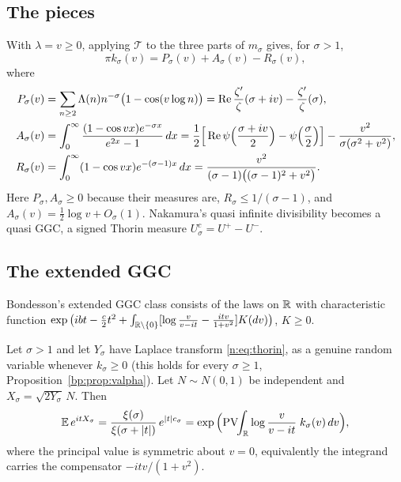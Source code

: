 \subsection{The pieces}

With $\lambda=v\ge0$, applying $\mathcal T$ to the three parts of $m_\sigma$ gives, for $\sigma>1$,
\begin{equation}\label{n:eq:pieces}
\pi k_\sigma(v)=P_\sigma(v)+A_\sigma(v)-R_\sigma(v),
\end{equation}
where
\begin{align*}
P_\sigma(v)&=\sum_{n\ge2}\Lambda(n)n^{-\sigma}\big(1-\cos(v\log n)\big)=\operatorname{Re}\frac{\zeta'}{\zeta}(\sigma+iv)-\frac{\zeta'}{\zeta}(\sigma),\\
A_\sigma(v)&=\int_0^\infty\frac{(1-\cos vx)e^{-\sigma x}}{e^{2x}-1}\,dx=\frac12\Big[\operatorname{Re}\psi\Big(\frac{\sigma+iv}2\Big)-\psi\Big(\frac\sigma2\Big)\Big]-\frac{v^2}{\sigma(\sigma^2+v^2)},\\
R_\sigma(v)&=\int_0^\infty(1-\cos vx)e^{-(\sigma-1)x}\,dx=\frac{v^2}{(\sigma-1)\big((\sigma-1)^2+v^2\big)} .
\end{align*}
Here $P_\sigma,A_\sigma\ge0$ because their measures are, $R_\sigma\le1/(\sigma-1)$, and $A_\sigma(v)=\frac12\log v+O_\sigma(1)$. Nakamura's quasi infinite divisibility becomes a quasi GGC, a signed Thorin measure $U^c_\sigma=U^+-U^-$.

\subsection{The extended GGC}

Bondesson's extended GGC class \cite{Bondesson} consists of the laws on $\mathbb{R}$ with characteristic function $\exp\big(ibt-\frac c2t^2+\int_{\mathbb{R}\setminus\{0\}}[\log\frac v{v-it}-\frac{itv}{1+v^2}]K(dv)\big)$, $K\ge0$.

\begin{theorem}[proved]\label{n:thm:eggc}
Let $\sigma>1$ and let $Y_\sigma$ have Laplace transform \eqref{n:eq:thorin}, as a genuine random variable whenever $k_\sigma\ge0$ (this holds for every $\sigma\ge1$, Proposition~\ref{bp:prop:valpha}). Let $N\sim N(0,1)$ be independent and $X_\sigma=\sqrt{2Y_\sigma}\,N$. Then
\begin{equation}\label{n:eq:eggc}
\mathbb{E}\,e^{itX_\sigma}=\frac{\xi(\sigma)}{\xi(\sigma+|t|)}\,e^{|t|c_\sigma}
=\exp\Big(\mathrm{PV}\!\!\int_{\mathbb{R}}\log\frac{v}{v-it}\;k_\sigma(v)\,dv\Big),
\end{equation}
where the principal value is symmetric about $v=0$, equivalently the integrand carries the compensator $-itv/(1+v^2)$.
\end{theorem}

